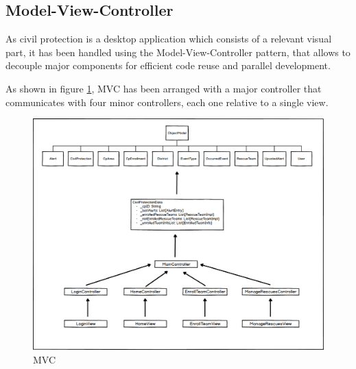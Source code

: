 \documentclass[a4paper,12pt]{report}
\begin{document}
\subsection{Model-View-Controller}
As civil protection is a desktop application which consists of a relevant visual part, it has been handled using the Model-View-Controller pattern, that allows to decouple major components for efficient code reuse and parallel development.

As shown in figure \ref{fig:MVC}, MVC has been arranged with a major controller that communicates with four minor controllers, each one relative to a single view.

\begin{figure}[ht]
\centering
\includegraphics[width=\textwidth]{figures/MVC.png}
\caption{MVC}
\label{fig:MVC}
\end{figure}



\end{document}

